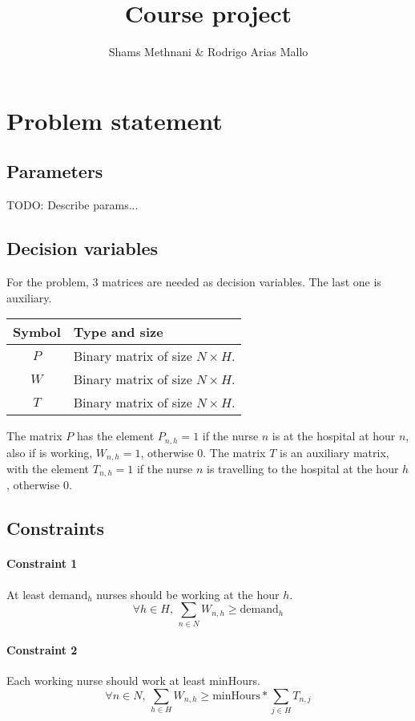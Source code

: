 \documentclass[12pt,a4paper]{article}
\title{Course project}
\author{Shams Methnani \& Rodrigo Arias Mallo}
\begin{document}
\maketitle

\section{Problem statement}

\subsection{Parameters}

TODO: Describe params...

\subsection{Decision variables}

For the problem, 3 matrices are needed as decision variables. The last one is
auxiliary.
%
\begin{table}[h]
\centering
\begin{tabular}{c l}
\toprule
Symbol & Type and size \\
\midrule
$P$ & Binary matrix of size $N \times H$.\\
$W$ & Binary matrix of size $N \times H$.\\
$T$ & Binary matrix of size $N \times H$.\\
\bottomrule
\end{tabular}
\end{table}

\noindent
The matrix $P$ has the element $P_{n,h} = 1$ if the nurse $n$ is at the hospital
at hour $n$, also if is working, $W_{n,h} = 1$, otherwise 0.
%
The matrix $T$ is an auxiliary matrix, with the element $T_{n,h} = 1$ if the
nurse $n$ is travelling to the hospital at the hour $h$, otherwise 0.

\subsection{Constraints}

\paragraph{Constraint 1} At least $\textrm{demand}_h$ nurses should be working
at the hour $h$.
$$ \forall h\in H,\, \sum_{n \in N} W_{n,h} \ge \textrm{demand}_h$$
%
\paragraph{Constraint 2} Each working nurse should work at least minHours.
$$ \forall n \in N,\, \sum_{h \in H} W_{n,h} \ge \textrm{minHours} * \sum_{j \in H} T_{n,j} $$
%
\end{document}
